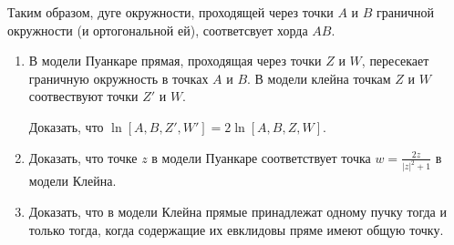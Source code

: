 	Таким образом, дуге окружности, проходящей через точки $A$ и $B$ граничной окружности (и ортогональной ей), соответсвует хорда $AB$.
	\begin{enumerate}[resume*]
 			

		\item В модели Пуанкаре прямая, проходящая через точки $Z$ и $W$, пересекает граничную окружность в точках $A$ и $B$. В модели клейна точкам $Z$ и $W$ соотвествуют точки $Z'$ и $W$.

		Доказать, что $\ln[A, B, Z', W'] = 2\ln[A, B, Z, W].$
 
		\item Доказать, что точке $z$ в модели Пуанкаре соответствует точка $w = \frac{2z}{|z|^2 + 1}$ в модели Клейна.


		\item Доказать, что в модели Клейна прямые принадлежат одному пучку тогда и только тогда, когда содержащие их евклидовы пряме имеют общую точку.
 

\end{enumerate}
